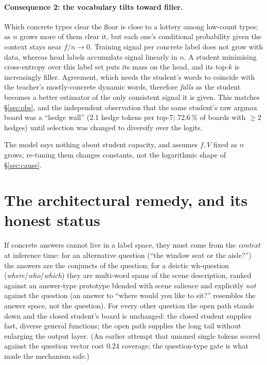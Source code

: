 \documentclass{article}
\begin{document}
\paragraph{Consequence 2: the vocabulary tilts toward filler.} Which concrete
types clear the floor is close to a lottery among low-count types; as $n$
grows more of them clear it, but each one's conditional probability given the
context stays near $f/n\to0$. Training signal per concrete label does not grow
with data, whereas head labels accumulate signal linearly in $n$. A student
minimising cross-entropy over this label set puts its mass on the head, and
its top-$k$ is increasingly filler. Agreement, which needs the student's words
to coincide with the teacher's mostly-concrete dynamic words, therefore
\emph{falls} as the student becomes a better estimator of the only consistent
signal it is given. This matches \S\ref{sec:obs}, and the independent
observation that the same student's raw argmax board was a ``hedge wall''
(2.1 hedge tokens per top-7; 72.6\,\% of boards with $\ge2$ hedges) until
selection was changed to diversify over the logits.

The model says nothing about student capacity, and assumes $f,V$ fixed as
$n$ grows; re-tuning them changes constants, not the logarithmic shape of
\S\ref{sec:cause}.

\section{The architectural remedy, and its honest status}
\label{sec:remedy}
If concrete answers cannot live in a label space, they must come from
the \emph{context} at inference time: for an alternative question (``the window seat or the
aisle?'') the answers are the conjuncts of the question; for a deictic
wh-question (\emph{where}/\emph{who}/\emph{which}) they are multi-word spans
of the scene description, ranked against an answer-type prototype blended with
scene salience and explicitly \emph{not} against the question (an answer to
``where would you like to sit?'' resembles the answer space, not the
question). For every other question the open path stands down and the closed
student's board is unchanged: the closed student supplies fast, diverse general
functions; the open path supplies the long tail without enlarging the output
layer. (An earlier attempt that unioned single tokens scored against the
question vector cost 0.24 coverage; the question-type gate is what made the
mechanism safe.)
\end{document}
